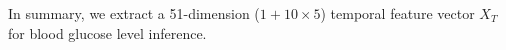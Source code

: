 In summary, we extract a 51-dimension ($1+10\times 5$) temporal feature vector $X_T$ for blood glucose level inference.

%
%



%


